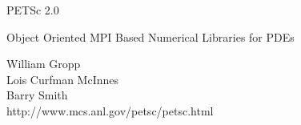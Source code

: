 %
%
\def\stripe{\ifvmode\else\par\vskip-\baselineskip\vskip12pt\fi
\hbox to \hsize{\leaders\hrule height 4.5pt\hfil}\vskip-\baselineskip
            \vskip 3.5pt 
            \hbox to \hsize{\leaders\hrule height 1.5pt\hfil}
            \vskip -10pt}
\def\vt{\protect\begin{slide}}
\def\ve{\vfil\protect\end{slide}}
\def\vtt#1{\begin{slide}{}{\bf #1}\stripe\vfil\parskip8pt}
\def\vttstar#1{\begin{slide*}{}{\bf #1}\stripe\vfil\parskip8pt}
\def\vestar{\vfil\protect\end{slide*}}

\landscapeonly



\vt
\thispagestyle{empty}

\begin{center}
\Red {}
{\Huge \hspace{-1.5in} PETSc 2.0 } \\
\vspace{.4in} 
{\Large Object Oriented MPI Based Numerical Libraries for PDEs}\\
\end{center}

\begin{center}
\Blue
William Gropp\\
Lois Curfman McInnes \\
Barry Smith\\
\Cyan
{\Large http://www.mcs.anl.gov/petsc/petsc.html}\\
\Black
\end{center}
\vspace{0cm}
\centerline{\hspace{.75in} }
\ve


